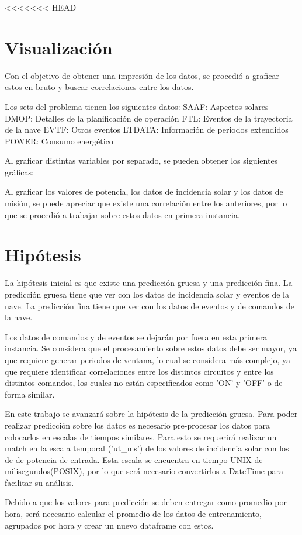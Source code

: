 \documentclass[../Main.tex]{subfiles}
\begin{document}
<<<<<<< HEAD
\section{Visualización}
Con el objetivo de obtener una impresión de los datos, se procedió a graficar estos en bruto y buscar correlaciones entre los datos. 

Los sets del problema tienen los siguientes datos:
SAAF: Aspectos solares
DMOP: Detalles de la planificación de operación
FTL: Eventos de la trayectoria de la nave
EVTF: Otros eventos
LTDATA: Información de periodos extendidos
POWER: Consumo energético

Al graficar distintas variables por separado, se pueden obtener los siguientes gráficas:

Al graficar los valores de potencia, los datos de incidencia solar y los datos de misión, se puede apreciar que existe una correlación entre los anteriores, por lo que se procedió a trabajar sobre estos datos en primera instancia. 

\section{Hipótesis}
La hipótesis inicial es que existe una predicción gruesa y una predicción fina. La predicción gruesa tiene que ver con los datos de incidencia solar y eventos de la nave. La predicción fina tiene que ver con los datos de eventos y de comandos de la nave.

Los datos de comandos y de eventos se dejarán por fuera en esta primera instancia. Se considera que el procesamiento sobre estos datos debe ser mayor, ya que requiere generar periodos de ventana, lo cual se considera más complejo, ya que requiere identificar correlaciones entre los distintos circuitos y entre los distintos comandos, los cuales no están especificados como 'ON' y 'OFF' o de forma similar.

En este trabajo se avanzará sobre la hipótesis de la predicción gruesa. Para poder realizar predicción sobre los datos es necesario pre-procesar los datos para colocarlos en escalas de tiempos similares. Para esto se requerirá realizar un match en la escala temporal ('ut_ms') de los valores de incidencia solar con los de de potencia de entrada. Esta escala se encuentra en tiempo UNIX de milisegundos(POSIX), por lo que será necesario convertirlos a DateTime para facilitar su análisis.

Debido a que los valores para predicción se deben entregar como promedio por hora, será necesario calcular el promedio de los datos de entrenamiento, agrupados por hora y crear un nuevo dataframe con estos.
\end{document}

